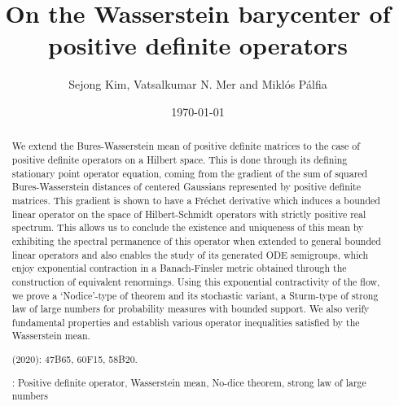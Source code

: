 \documentclass[12pt,reqno]{amsart}
\begin{document}
\title[On the Wasserstein barycenter of positive definite operators]{On the Wasserstein barycenter of positive definite operators}

\author{Sejong Kim, Vatsalkumar N. Mer and Mikl\'os P\'alfia}

\date{\today}


\begin{abstract}
We extend the Bures-Wasserstein mean of positive definite matrices to the case of positive definite operators on a Hilbert space. This is done through its defining stationary point operator equation, coming from the gradient of the sum of squared Bures-Wasserstein distances of centered Gaussians represented by positive definite matrices. This gradient is shown to have a Fr\'echet derivative which induces a bounded linear operator on the space of Hilbert-Schmidt operators with strictly positive real spectrum. This allows us to conclude the existence and uniqueness of this mean by exhibiting the spectral permanence of this operator when extended to general bounded linear operators and also enables the study of its generated ODE semigroups, which enjoy exponential contraction in a Banach-Finsler metric obtained through the construction of equivalent renormings. Using this exponential contractivity of the flow, we prove a `Nodice'-type of theorem and its stochastic variant, a Sturm-type of strong law of large numbers for probability measures with bounded support. We also verify fundamental properties and establish various operator inequalities satisfied by the Wasserstein mean.

\vspace{5mm}

 (2020): 47B65, 60F15, 58B20.

: Positive definite operator, Wasserstein mean, No-dice theorem, strong law of large numbers
\end{abstract}

\maketitle
\end{document}
